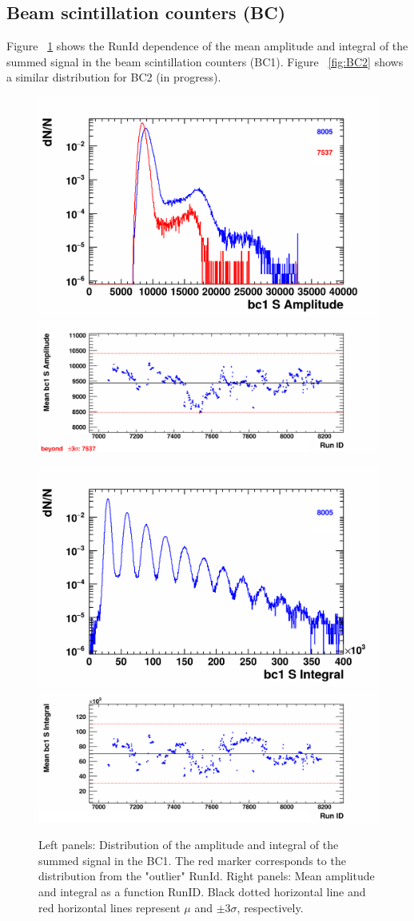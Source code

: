 \subsection{Beam scintillation counters (BC)}

    Figure ~\ref{fig:BC1} shows the RunId dependence of the mean amplitude and integral of the summed signal in the beam scintillation counters (BC1). 
    Figure ~\ref{fig:BC2} shows a similar distribution for BC2 (in progress).

    \begin{figure}[H]
        \begin{center}
            \includegraphics[width=0.35\linewidth]{../pict/QA_RunByRun_24.12/H1/nVtxTr_h2_RunId_bc1sAmp.png}
            \includegraphics[width=0.60\linewidth]{../pict/QA_RunByRun_24.12/nVtxTr_h2_RunId_bc1sAmp.png}

            \includegraphics[width=0.35\linewidth]{../pict/QA_RunByRun_24.12/H1/nVtxTr_h2_RunId_bc1sInt.png}
            \includegraphics[width=0.60\linewidth]{../pict/QA_RunByRun_24.12/nVtxTr_h2_RunId_bc1sInt.png}
            \vspace{-3mm}
            \caption{Left panels: Distribution of the amplitude and integral of the summed signal in the BC1. The red marker corresponds to the distribution from the "outlier" RunId. Right panels: Mean amplitude and integral as a function RunID. Black dotted horizontal line and red horizontal lines represent $\mu$ and $\pm3\sigma$, respectively.}
            \label{fig:BC1}
        \end{center}
        \vspace{-5mm}
    \end{figure}

